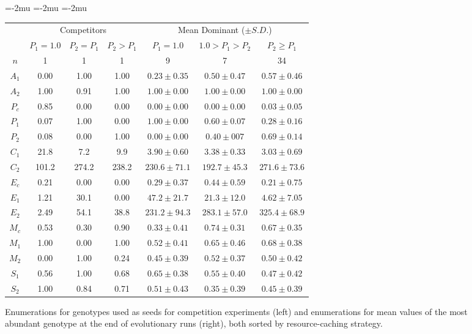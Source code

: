 \begin{figure}%

\begin{center}
\setlength\tabcolsep{1.5pt} %
\medmuskip=-2mu
\thinmuskip=-2mu
\thickmuskip=-2mu
\nulldelimiterspace=-1pt
\scriptspace=0pt
\begin{tabular}{ | c || c c c | c c c | }
  \multicolumn{1}{c}{} & \multicolumn{3}{c}{Competitors} & \multicolumn{3}{c}{Mean Dominant ($\pm S.D.$)} \\
 \cline{2-7}
  \multicolumn{1}{c|}{} & \tiny{$P_{1} = 1.0$} & \tiny{$P_{2} = P_{1}$} & \tiny{$P_{2} > P_{1}$} & \tiny{$P_{1} = 1.0$} & \tiny{$1.0 > P_{1} > P_{2}$} & \tiny{$P_{2} \geq P_{1}$}  \\
 \hline
 $n$ & 1 & 1 & 1 & 9 & 7 & 34  \\
 \hhline{|=||===|===|}
 $A_1$ & 0.00 & 1.00 & 1.00 & $0.23 \pm 0.35$ & $0.50 \pm 0.47$ & $0.57 \pm 0.46$ \\
 $A_2$ & 1.00 & 0.91 & 1.00 & $1.00 \pm  0.00$ & $1.00 \pm 0.00$ & $1.00 \pm 0.00$ \\
 \hline
 $P_{c}$ & 0.85 & 0.00 & 0.00 & $0.00 \pm 0.00$ & $0.00 \pm 0.00$ & $0.03 \pm 0.05$ \\
 $P_1$ & 0.07 & 1.00 & 0.00 & $1.00 \pm 0.00$ & $0.60 \pm 0.07$ & $0.28 \pm 0.16$ \\
 $P_2$ & 0.08 & 0.00 & 1.00 & $0.00 \pm 0.00$ & $0.40 \pm 007$ & $0.69 \pm 0.14$ \\
 \hline
 $C_1$ & 21.8 & 7.2 & 9.9 & $3.90 \pm 0.60$ & $3.38 \pm 0.33$ & $3.03 \pm 0.69$ \\
 $C_2$ & 101.2 & 274.2 & 238.2 & $230.6 \pm 71.1$ & $192.7 \pm 45.3$ & $271.6 \pm 73.6 $ \\
 \hline
 $E_{c}$ & 0.21 & 0.00 & 0.00 & $0.29 \pm 0.37$ & $0.44 \pm 0.59$ & $0.21 \pm 0.75$ \\
 $E_1$ & 1.21 & 30.1 & 0.00 & $47.2 \pm 21.7$ & $21.3 \pm 12.0$ & $4.62 \pm 7.05$ \\
 $E_2$ & 2.49 & 54.1 & 38.8 & $231.2 \pm 94.3$ & $283.1 \pm 57.0$ & $325.4 \pm 68.9$ \\
 \hline
 $M_{c}$ & 0.53 & 0.30 & 0.90 & $0.33 \pm 0.41$ & $0.74 \pm 0.31$ & $0.67 \pm 0.35$ \\
 $M_1$ & 1.00 & 0.00 & 1.00 & $0.52 \pm 0.41$ & $0.65 \pm 0.46$ & $0.68 \pm 0.38$ \\
 $M_2$ & 0.00 & 1.00 & 0.24 & $0.45 \pm 0.39$ & $0.52 \pm 0.37$ & $0.50 \pm 0.42$ \\
 \hline
 $S_1$ & 0.56 & 1.00 & 0.68 & $0.65 \pm 0.38$ & $0.55 \pm 0.40$ & $0.47 \pm 0.42$ \\
 $S_2$ & 1.00 & 0.84 & 0.71 & $0.51 \pm 0.43$ & $0.35 \pm 0.39$ & $0.45 \pm 0.39$ \\
 \hline
\end{tabular}
\end{center}
\caption{
Enumerations for genotypes used as seeds for competition experiments (left) and enumerations for mean values of the most abundant genotype at the end of evolutionary runs (right), both sorted by resource-caching strategy.
}
\label{fig:genotypes}
\end{figure}

